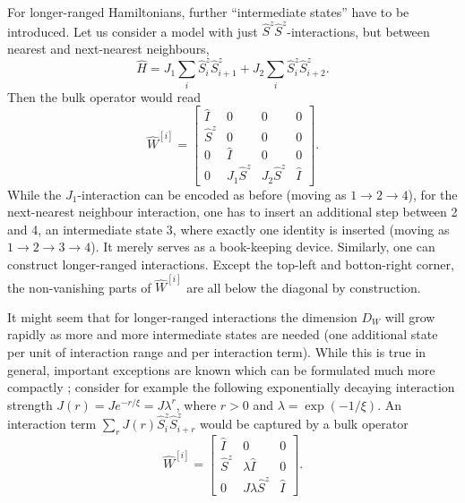 \documentclass[a4paper,10pt,oneside,onecolumn,1p,times]{elsarticle}
\begin{document}
For longer-ranged Hamiltonians, further ``intermediate states'' have to be introduced. Let us consider a model with just $\hat{S}^z \hat{S}^z$-interactions, but between nearest and next-nearest neighbours,
\begin{equation}
\hat{H} = J_1 \sum_{i} \hat{S}^z_i \hat{S}^z_{i+1} + J_2 \sum_{i} \hat{S}^z_i \hat{S}^z_{i+2} .
\end{equation}
Then the bulk operator would read
\begin{equation}
\hat{W}^{[i]} = \left[
\begin{array}{cccc}
\hat{I} & 0 & 0 & 0 \\
\hat{S}^z & 0 & 0 & 0 \\
0 & \hat{I} & 0 & 0 \\
0 & J_1\hat{S}^z & J_2\hat{S}^z & \hat{I}
\end{array}
\right] .
\end{equation}
While the $J_1$-interaction can be encoded as before (moving as $1 \rightarrow 2 \rightarrow 4$), for the next-nearest neighbour interaction, one has to insert an additional step between 2 and 4, an intermediate state 3, where exactly one identity is inserted (moving as $1 \rightarrow 2 \rightarrow 3 \rightarrow 4$). It merely serves as a book-keeping device. Similarly, one can construct longer-ranged interactions. Except the top-left and botton-right corner, the non-vanishing parts of $\hat{W}^{[i]}$ are all below the diagonal by construction.

It might seem that for longer-ranged interactions the dimension $D_W$ will grow rapidly as more and more intermediate states are needed (one additional state per unit of interaction range and per interaction term). While this is true in general, important exceptions are known which can be formulated much more compactly \cite{Frowis10,Crosswhite08a}; consider for example the following exponentially decaying interaction strength $J(r)=J e^{-r/\xi} = J \lambda^r$, where $r>0$ and $\lambda = \exp(-1/\xi)$. An interaction term $\sum_r J(r)\hat{S}^z_i \hat{S}^z_{i+r}$ would be captured by a bulk operator
\begin{equation}
\hat{W}^{[i]} = \left[
\begin{array}{ccc}
\hat{I} & 0 & 0  \\
\hat{S}^z & \lambda\hat{I} & 0  \\
0 & J\lambda \hat{S}^z & \hat{I}
\end{array}
\right] .
\end{equation}
\end{document}
